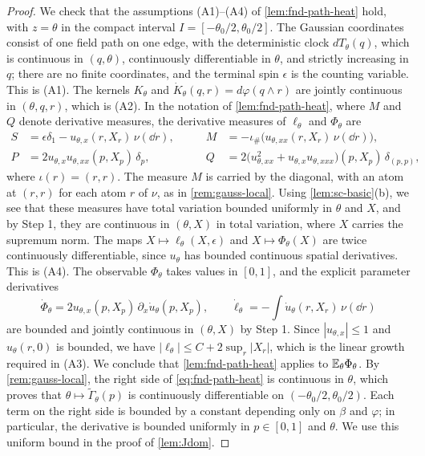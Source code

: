 \begin{proof}
We check that the assumptions (A1)--(A4) of \cref{lem:fnd-path-heat}
hold, with $z=\theta$ in the compact interval
$I=[-\theta_0/2,\theta_0/2]$. The Gaussian coordinates consist of one
field path on one edge, with the deterministic clock $dT_\theta(q)$,
which is continuous in $(q,\theta)$, continuously differentiable in
$\theta$, and strictly increasing in $q$; there are no finite
coordinates, and the terminal spin $\epsilon$ is the counting variable.
This is (A1). The kernels $K_\theta$ and
$\dot K_\theta(q,r)=d\varphi(q\wedge r)$ are jointly continuous in
$(\theta,q,r)$, which is (A2). In the notation of
\cref{lem:fnd-path-heat}, where $M$ and $Q$ denote derivative measures,
the derivative measures of $\ell_\theta$ and $\Phi_\theta$ are
\[
 \begin{aligned}
 S&=\epsilon\delta_1-u_{\theta,x}(r,X_r)\,\nu(\dd r),&\qquad
 M&=-\iota_\#\bigl(u_{\theta,xx}(r,X_r)\,\nu(\dd r)\bigr),\\
 P&=2u_{\theta,x}u_{\theta,xx}(p,X_p)\,\delta_p,&\qquad
 Q&=2\bigl(u_{\theta,xx}^2+u_{\theta,x}u_{\theta,xxx}\bigr)(p,X_p)\,
   \delta_{(p,p)},
 \end{aligned}
\]
where $\iota(r)=(r,r)$. The measure $M$ is carried by the diagonal,
with an atom at $(r,r)$ for each atom $r$ of $\nu$, as in
\cref{rem:gauss-local}. Using \cref{lem:sc-basic}(b), we see that these
measures have
total variation bounded uniformly in $\theta$ and $X$, and by Step 1,
they are continuous in $(\theta,X)$ in total variation, where $X$
carries the supremum norm. The maps $X\mapsto\ell_\theta(X,\epsilon)$
and $X\mapsto\Phi_\theta(X)$ are twice continuously differentiable,
since $u_\theta$ has bounded continuous spatial derivatives. This is
(A4). The observable $\Phi_\theta$ takes values in $[0,1]$, and the
explicit parameter derivatives
\[
 \dot\Phi_\theta=2u_{\theta,x}(p,X_p)\,\partial_x\dot u_\theta(p,X_p),\qquad
 \dot\ell_\theta=-\int\dot u_\theta(r,X_r)\,\nu(\dd r)
\]
are bounded and jointly continuous in $(\theta,X)$ by Step 1. Since
$|u_{\theta,x}|\le1$ and $u_\theta(r,0)$ is bounded, we have
$|\ell_\theta|\le C+2\sup_r|X_r|$, which is the linear growth required
in (A3). We conclude that \cref{lem:fnd-path-heat} applies to
$\mathbb E_\theta\Phi_\theta$. By \cref{rem:gauss-local}, the right side of
\eqref{eq:fnd-path-heat} is continuous in $\theta$, which proves that
$\theta\mapsto\widetilde\Gamma_\theta(p)$ is continuously differentiable
on $(-\theta_0/2,\theta_0/2)$. Each term on the right side is bounded
by a constant depending only on $\beta$ and $\varphi$; in particular,
the derivative is bounded uniformly in $p\in[0,1]$ and $\theta$. We use
this uniform bound in the proof of \cref{lem:Jdom}.


\end{proof}
